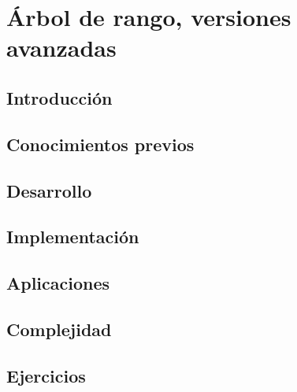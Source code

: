 \chapter{Árbol de rango, versiones avanzadas}
\section{Introducción}

\section{Conocimientos previos}

\section{Desarrollo}

\section{Implementación}

\section{Aplicaciones}

\section{Complejidad}

\section{Ejercicios}
